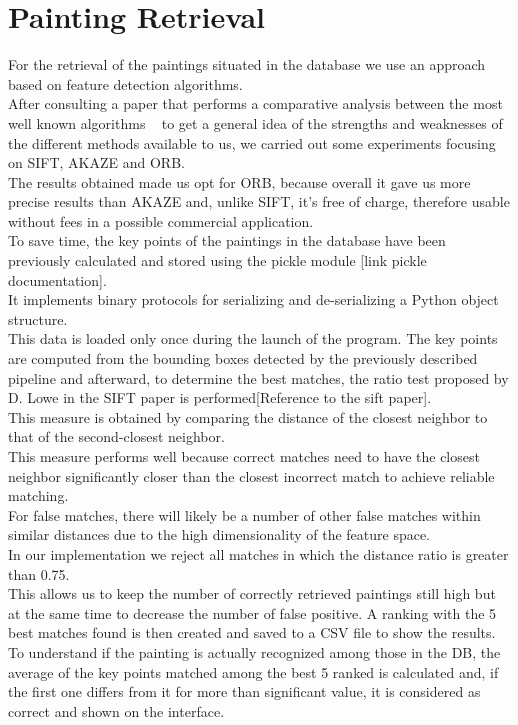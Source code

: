 \documentclass[conference]{IEEEtran}
\begin{document}
\section{Painting Retrieval}
For the retrieval of the paintings situated in the database we use an approach based on feature detection algorithms.\\ 
After consulting a paper that performs a comparative analysis between the most well known algorithms ~\cite{b1} to get a general idea of the strengths and weaknesses of the different methods available to us, we carried out some experiments focusing on SIFT, AKAZE and ORB.\\
The results obtained made us opt for ORB, because overall it gave us more precise results than AKAZE and, unlike SIFT, it’s free of charge, therefore usable without fees in a possible commercial application.\\
To save time, the key points of the paintings in the database have been previously calculated and stored using the pickle module [link pickle documentation].\\
It implements binary protocols for serializing and de-serializing a Python object structure.\\
This data is loaded only once during the launch of the program.
The key points are computed from the bounding boxes detected by the previously described pipeline and afterward, to determine the best matches, the ratio test proposed by D. Lowe in the SIFT paper is performed[Reference to the sift paper].\\
This measure is obtained by comparing the distance of the closest neighbor to that of the second-closest neighbor.\\
This measure performs well because correct matches need to have the closest neighbor significantly closer than the closest incorrect match to achieve reliable matching.\\
For false matches, there will likely be a number of other false matches within similar distances due to the high dimensionality of the feature space.\\
In our implementation we reject all matches in which the distance ratio is greater than 0.75.\\
This allows us to keep the number of correctly retrieved paintings still high but at the same time to decrease the number of false positive.
A ranking with the 5 best matches found is then created and saved to a CSV file to show the results.\\
To understand if the painting is actually recognized among those in the DB, the average of the key points matched among the best 5 ranked is calculated and, if the first one differs from it for more than significant value, it is considered as correct and shown on the interface.
\end{document}
